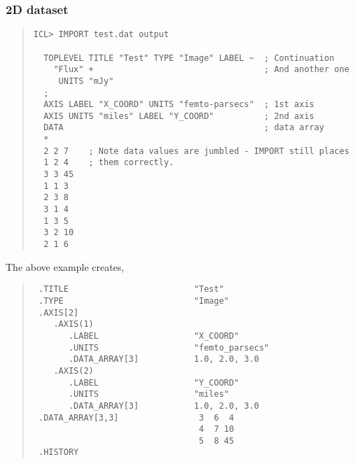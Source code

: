 \documentclass{book}
\renewcommand{\_}{{\tt\char'137}}     %
\begin{document}
\subsubsection{2D dataset}
\begin{quote}\begin{verbatim}
ICL> IMPORT test.dat output
 
  TOPLEVEL TITLE "Test" TYPE "Image" LABEL ~  ; Continuation
    "Flux" +                                  ; And another one
     UNITS "mJy"
  ;
  AXIS LABEL "X_COORD" UNITS "femto-parsecs"  ; 1st axis
  AXIS UNITS "miles" LABEL "Y_COORD"          ; 2nd axis
  DATA                                        ; data array
  *
  2 2 7    ; Note data values are jumbled - IMPORT still places
  1 2 4    ; them correctly.
  3 3 45
  1 1 3
  2 3 8
  3 1 4
  1 3 5
  3 2 10
  2 1 6
\end{verbatim}\end{quote}
The above example creates,
\begin{quote}\begin{verbatim}
 .TITLE                         "Test"
 .TYPE                          "Image"
 .AXIS[2]
    .AXIS(1)
       .LABEL                   "X_COORD"
       .UNITS                   "femto_parsecs"
       .DATA_ARRAY[3]           1.0, 2.0, 3.0
    .AXIS(2)
       .LABEL                   "Y_COORD"
       .UNITS                   "miles"
       .DATA_ARRAY[3]           1.0, 2.0, 3.0
 .DATA_ARRAY[3,3]                3  6  4
                                 4  7 10
                                 5  8 45
 .HISTORY
\end{verbatim}\end{quote}
\end{document}
